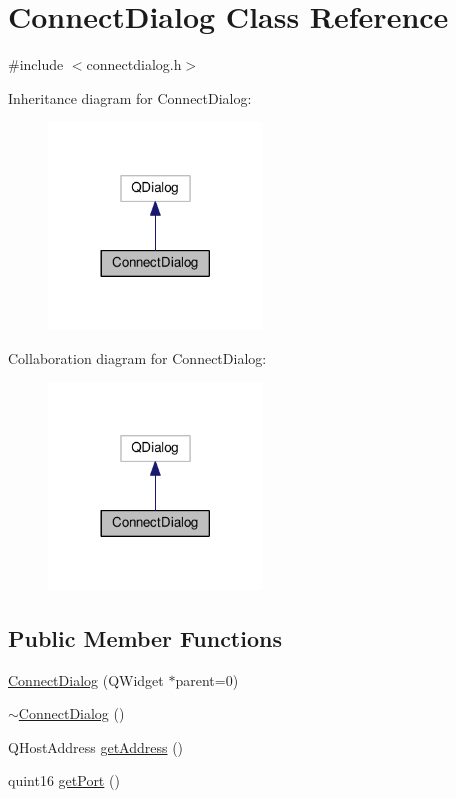 \hypertarget{class_connect_dialog}{}\section{Connect\+Dialog Class Reference}
\label{class_connect_dialog}


{\ttfamily \#include $<$connectdialog.\+h$>$}



Inheritance diagram for Connect\+Dialog\+:
\nopagebreak
\begin{figure}[H]
\begin{center}
\leavevmode
\includegraphics[width=161pt]{class_connect_dialog__inherit__graph}
\end{center}
\end{figure}


Collaboration diagram for Connect\+Dialog\+:
\nopagebreak
\begin{figure}[H]
\begin{center}
\leavevmode
\includegraphics[width=161pt]{class_connect_dialog__coll__graph}
\end{center}
\end{figure}
\subsection*{Public Member Functions}
\begin{DoxyCompactItemize}
\item 
\hyperlink{class_connect_dialog_a7c885971cc4b844118058f4b404e0f64}{Connect\+Dialog} (Q\+Widget $\ast$parent=0)
\item 
\hyperlink{class_connect_dialog_a019b699922abb0602dd6310c54e20cb4}{$\sim$\+Connect\+Dialog} ()
\item 
Q\+Host\+Address \hyperlink{class_connect_dialog_a4bb54225479eae0b620b457f65ce85b0}{get\+Address} ()
\item 
quint16 \hyperlink{class_connect_dialog_a6f3ec676633674dc77e741a00a7ace3c}{get\+Port} ()
\end{DoxyCompactItemize}


